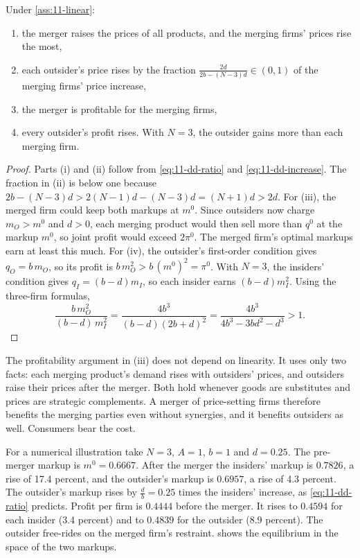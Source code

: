 \begin{proposition}\label{prop:11-dd}
Under \cref{ass:11-linear}:
\begin{enumerate}[label=(\roman*)]
  \item the merger raises the prices of all products, and the merging firms' prices rise the most,
  \item each outsider's price rises by the fraction $\frac{2d}{2b - (N-3)d} \in (0,1)$ of the merging firms'
        price increase,
  \item the merger is profitable for the merging firms,
  \item every outsider's profit rises. With $N = 3$, the outsider gains more than each merging firm.
\end{enumerate}
\end{proposition}

\begin{proof}
Parts (i) and (ii) follow from \eqref{eq:11-dd-ratio} and \eqref{eq:11-dd-increase}. The fraction in (ii) is below
one because $2b - (N-3)d > 2(N-1)d - (N-3)d = (N+1)d > 2d$. For (iii), the merged firm could keep both markups at
$m^0$. Since outsiders now charge $m_O > m^0$ and $d > 0$, each merging product would then sell more than $q^0$ at the
markup $m^0$, so joint profit would exceed $2\pi^0$. The merged firm's optimal markups earn at least this much. For
(iv), the outsider's first-order condition gives $q_O = b\,m_O$, so its profit is $b\,m_O^2 > b\,(m^0)^2 = \pi^0$.
With $N = 3$, the insiders' condition gives $q_I = (b - d)m_I$, so each insider earns $(b - d)m_I^2$. Using the
three-firm formulas,
\begin{equation*}
  \frac{b\,m_O^2}{(b-d)\,m_I^2} = \frac{4b^3}{(b-d)(2b+d)^2} = \frac{4b^3}{4b^3 - 3bd^2 - d^3} > 1 .
\end{equation*}
\end{proof}

The profitability argument in (iii) does not depend on linearity. It uses only two facts: each merging product's
demand rises with outsiders' prices, and outsiders raise their prices after the merger. Both hold whenever goods are
substitutes and prices are strategic complements. A merger of price-setting firms therefore benefits the merging
parties even without synergies, and it benefits outsiders as well. Consumers bear the cost.

For a numerical illustration take $N = 3$, $A = 1$, $b = 1$ and $d = 0.25$. The
pre-merger markup is $m^0 = 0.6667$. After the merger the insiders' markup is $0.7826$, a rise of 17.4 percent, and
the outsider's markup is $0.6957$, a rise of 4.3 percent. The outsider's markup rises by $\frac{d}{b} = 0.25$ times
the insiders' increase, as \eqref{eq:11-dd-ratio} predicts. Profit per firm is $0.4444$ before the merger. It rises
to $0.4594$ for each insider (3.4 percent) and to $0.4839$ for the outsider (8.9 percent). The outsider free-rides on
the merged firm's restraint.  shows the equilibrium in the space of the two markups.

